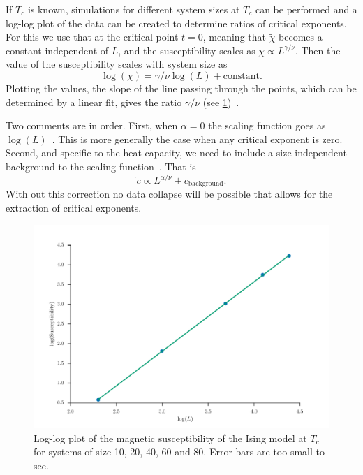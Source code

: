 \documentclass[11pt, a4paper]{report} %
\begin{document}
If \(T_c\) is known, simulations for different system sizes at \(T_c\) can be performed and a log-log plot of the data can be created to determine ratios of critical exponents.
For this we use that at the critical point \(t=0\), meaning that \(\widetilde{\chi}\) becomes a constant independent of \(L\), and the susceptibility scales as \(\chi \propto L^{\gamma/\nu}\).
Then the value of the susceptibility scales with system size as
\begin{equation}
	\log(\chi) = \gamma/\nu \log(L) + \mathrm{constant}.
\end{equation}
Plotting the values, the slope of the line passing through the points, which can be determined by a linear fit, gives the ratio \(\gamma/\nu\) (see \cref{fig:ising_magnetizabilities_loglog_plot})~\cite{corboz}.

Two comments are in order.
First, when \(\alpha =0\) the scaling function goes as \(\log(L)\)~\cite{landau:2015}.
This is more generally the case when any critical exponent is zero.
Second, and specific to the heat capacity, we need to include a size independent background to the scaling function~\cite{kim:1998}.
That is
\begin{equation}
	\widetilde{c} \propto L^{\alpha/\nu} + c_{\mathrm{background}}.
\end{equation}
With out this correction no data collapse will be possible that allows for the extraction of critical exponents.

\begin{figure}[htb]
	\centering
	\includegraphics[width=\linewidth]{ising_magnetizabilities_loglog_plot.pdf}
	\caption{Log-log plot of the magnetic susceptibility of the Ising model at \(T_c\) for systems of size 10, 20, 40, 60 and 80. Error bars are too small to see.}
	\label{fig:ising_magnetizabilities_loglog_plot}
\end{figure}
\end{document}
